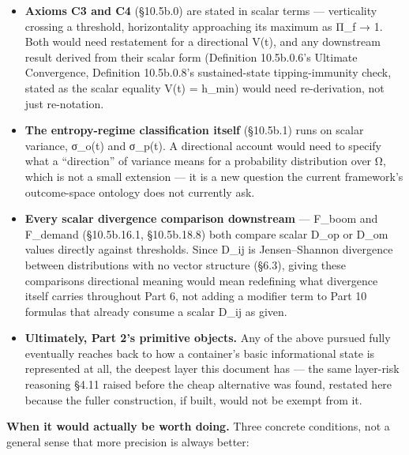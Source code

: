 \documentclass[
]{article}
\begin{document}
\begin{itemize}
\item
  \textbf{Axioms C3 and C4} (§10.5b.0) are stated in scalar terms ---
  verticality crossing a threshold, horizontality approaching its
  maximum as Π\_f → 1. Both would need restatement for a directional
  V(t), and any downstream result derived from their scalar form
  (Definition 10.5b.0.6's Ultimate Convergence, Definition 10.5b.0.8's
  sustained-state tipping-immunity check, stated as the scalar equality
  V(t) = h\_min) would need re-derivation, not just re-notation.
\item
  \textbf{The entropy-regime classification itself} (§10.5b.1) runs on
  scalar variance, σ\_o(t) and σ\_p(t). A directional account would need
  to specify what a ``direction'' of variance means for a probability
  distribution over Ω, which is not a small extension --- it is a new
  question the current framework's outcome-space ontology does not
  currently ask.
\item
  \textbf{Every scalar divergence comparison downstream} --- F\_boom and
  F\_demand (§10.5b.16.1, §10.5b.18.8) both compare scalar D\_op or
  D\_om values directly against thresholds. Since D\_ij is
  Jensen--Shannon divergence between distributions with no vector
  structure (§6.3), giving these comparisons directional meaning would
  mean redefining what divergence itself carries throughout Part 6, not
  adding a modifier term to Part 10 formulas that already consume a
  scalar D\_ij as given.
\item
  \textbf{Ultimately, Part 2's primitive objects.} Any of the above
  pursued fully eventually reaches back to how a container's basic
  informational state is represented at all, the deepest layer this
  document has --- the same layer-risk reasoning §4.11 raised before the
  cheap alternative was found, restated here because the fuller
  construction, if built, would not be exempt from it.
\end{itemize}

\textbf{When it would actually be worth doing.} Three concrete
conditions, not a general sense that more precision is always better:
\end{document}
